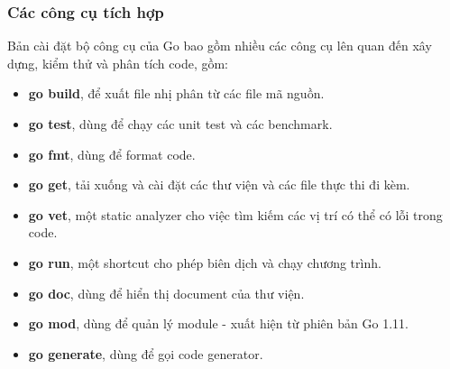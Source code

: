 \subsubsection{Các công cụ tích hợp}
Bản cài đặt bộ công cụ của Go bao gồm nhiều các công cụ
lên quan đến xây dựng, kiểm thử và phân tích code, gồm:
\begin{itemize}[topsep=0ex]
\item \textbf{go build}, để xuất file nhị phân từ các file mã nguồn.
\item \textbf{go test}, dùng để chạy các unit test và các benchmark.
\item \textbf{go fmt}, dùng để format code.
\item \textbf{go get}, tải xuống và cài đặt các thư viện và
    các file thực thi đi kèm. 
\item \textbf{go vet}, một static analyzer cho việc tìm kiếm
    các vị trí có thể có lỗi trong code. 
\item \textbf{go run}, một shortcut cho phép biên dịch
    và chạy chương trình. 
\item \textbf{go doc}, dùng để hiển thị document của thư viện. 
\item \textbf{go mod}, dùng để quản lý module - xuất hiện từ
    phiên bản Go 1.11. 
\item \textbf{go generate}, dùng để gọi code generator.
\end{itemize}
